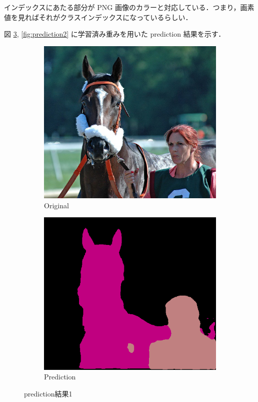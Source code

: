 \documentclass[onecolumn]{ujarticle}   %
\begin{document}
	インデックスにあたる部分が PNG 画像のカラーと対応している．つまり，画素値を見ればそれがクラスインデックスになっているらしい．

	図 \ref{fig:prediction1}, \ref{fig:prediction2} に学習済み重みを用いた prediction 結果を示す．

	\begin{figure}[t]
		\centering
		\vspace{-7mm}
		\begin{subfigure}{0.45\columnwidth}
			\centering
			\hspace*{-5mm}
			\includegraphics[width=1.3\columnwidth]{000024_image.png}
			\caption{Original}
			\label{fig:original1}
		\end{subfigure}
		\begin{subfigure}{0.45\columnwidth}
			\centering
			\hspace*{-5mm}
			\includegraphics[width=1.3\columnwidth]{000024_prediction.png}
			\caption{Prediction}
			\label{fig:prediction_result1}
		\end{subfigure}
		\caption{prediction結果1}
		\label{fig:prediction1}
	\end{figure}
\end{document}
